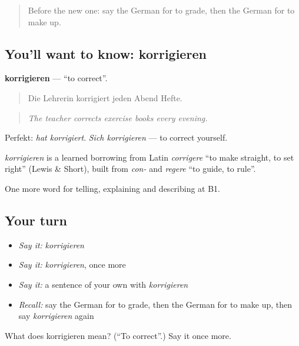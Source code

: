 \label{lesson:GE-C379-korrigieren}



\begin{quote}
Before the new one: say the German for to grade, then the German for to make up.
\end{quote}

\subsection*{You'll want to know: korrigieren}
\textbf{korrigieren} — \textquotedblleft{}to correct\textquotedblright{}.

\begin{quote}
Die Lehrerin korrigiert jeden Abend Hefte.
\end{quote}

\begin{quote}
\emph{The teacher corrects exercise books every evening.}
\end{quote}

Perfekt: \emph{hat korrigiert}. \emph{Sich korrigieren} — to correct yourself.

\begin{cousinweb}
\emph{korrigieren} is a learned borrowing from Latin \emph{corrigere} \textquotedblleft{}to make straight, to set right\textquotedblright{} (Lewis \& Short), built from \emph{con-} and \emph{regere} \textquotedblleft{}to guide, to rule\textquotedblright{}.
\end{cousinweb}

\begin{grammarlens}[title={What you've built}]
One more word for telling, explaining and describing at B1.
\end{grammarlens}

\subsection*{Your turn}
\begin{itemize}
\raggedright
  \item \emph{Say it:} \emph{korrigieren}
  \item \emph{Say it:} \emph{korrigieren}, once more
  \item \emph{Say it:} a sentence of your own with \emph{korrigieren}
  \item \emph{Recall:} say the German for to grade, then the German for to make up, then say \emph{korrigieren} again
\end{itemize}

\begin{tcolorbox}[breakable,colback=teal!4,colframe=teal!35!black,title={Before you move on}]
What does korrigieren mean? (\textquotedblleft{}To correct\textquotedblright{}.) Say it once more.
\end{tcolorbox}
